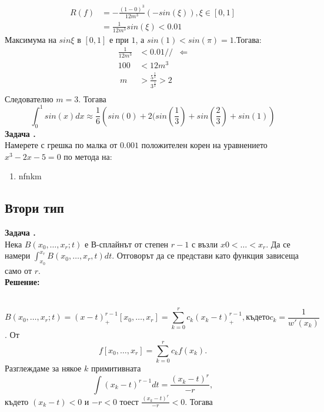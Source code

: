 \documentclass[12pt]{article}
\newcounter{problem}
\newcounter{solution}
\newcommand\problem{%
  \stepcounter{problem}%
  \textbf{Задача \theproblem.}~%
  \\
}
\newcommand\solution{%
  \textbf{Решение:}\\~%
}
\begin{document}
    \begin{align*}
        R(f)&= - \frac{(1-0)^3}{12m^3}(-sin(\xi)), \xi\in[0,1]\\
            &= \frac{1}{12m^3}sin(\xi)<0.01
    \end{align*}
    Максимума на $sin\xi$ в $[0,1]$ е при $1$, а $sin(1)<sin(\pi)=1$.Тогава:
    \begin{align*}
        \frac{1}{12m^3}&<0.01//
        &\Leftarrow\\
        100 &<12m^3\\\
        m   &> \frac{5^{\frac{2}{3}}}{3^\frac{1}{3}}>2\\
    \end{align*}
    Следователно $m=3$.
    Тогава
    \begin{equation*}
        \boxed{\int_{0}^{1}sin(x)dx\approx\frac{1}{6}\left (sin(0)+2(sin(\frac{1}{3})+sin(\frac{2}{3})+sin(1)\right )}
    \end{equation*}
    \problem
    Намерете с грешка по малка от $0.001$ положителен корен на уравнението $x^3-2x-5=0$ по метода на:
    \begin{enumerate}[a]
        \item{nfnkm}
    \end{enumerate}
\begin{center}{\section*{Втори тип}}\end{center}
    \setcounter{problem}{6}
    \problem
        Нека $B(x_0,\ldots,x_r;t)$  е  В-сплайнът от степен $r-1$ с възли $x0<\ldots<x_r.$ Да се намери $\int_{x_0}^{x_r}B(x_0,\ldots,x_r,t)dt$. Отговорът да се представи като функция зависеща само от $r$.
    \\
    \solution
        \begin{equation*}
        B(x_0,\ldots,x_r;t)=(x-t)^{r-1}_+[x_0,\ldots,x_r]=\sum_{k=0}^{r}c_k(x_k-t)^{r-1}_+, \text{където} c_k = \frac{1}{w'(x_k)}
        \end{equation*}.
        От
        \begin{equation*}
        f[x_0,\ldots,x_r] = \sum_{k=0}^{r}c_kf(x_k).
        \end{equation*}
        Разглеждаме за някое $k$ примитивната
        \begin{equation*}
        \int (x_k-t)^{r-1}dt = \frac{(x_k-t)^r}{-r},
        \end{equation*}
        където $(x_k-t)<0$ и $-r<0$ тоест $\frac{(x_k-t)^r}{-r}<0$. Тогава
\end{document}
